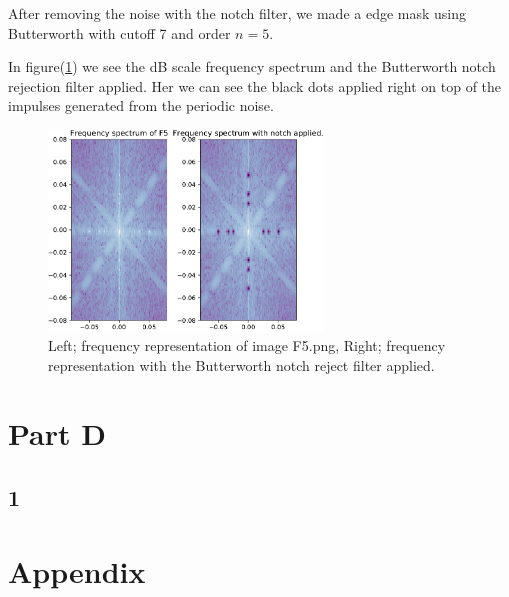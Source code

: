 {After removing the noise with the notch filter, we made a edge mask using Butterworth with cutoff 7 and order $n = 5$.



In figure(\ref{F5notch}) we see the dB scale frequency spectrum and the Butterworth notch rejection filter applied. Her we can see the black dots applied right on top of the impulses generated from the periodic noise.

    \begin{figure}[!htb]
        {\centering
            \includegraphics[width=0.65\textwidth]{removed_per_noise_freq.pdf}
            \caption{Left; frequency representation of image F5.png, Right; frequency representation with the Butterworth notch reject filter applied.}
            \label{F5notch}
        \par}
        \end{figure}






\section{Part D}
\subsection{1}







\newpage
\section{Appendix}



}
